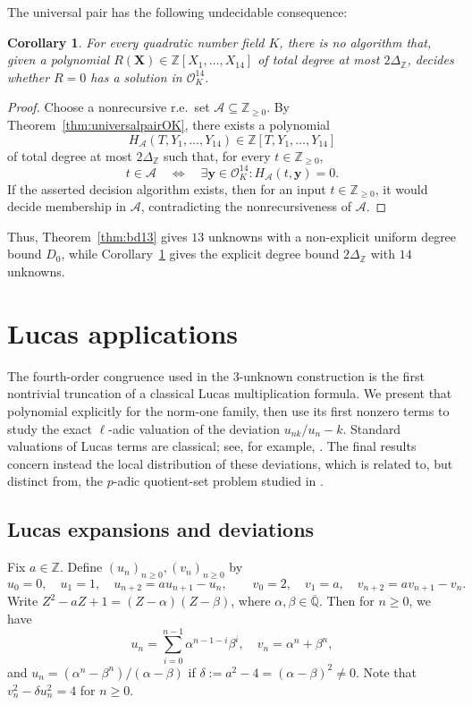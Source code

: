 \documentclass[12pt]{amsart}
\numberwithin{equation}{section}
\newtheorem{corollary}[theorem]{Corollary}
\theoremstyle{remark}
\theoremstyle{plain}
\newcommand{\Z}{\mathbb{Z}}
\newcommand{\Q}{\mathbb{Q}}
\newcommand{\sO}{\mathcal{O}}
\newcommand{\sA}{\mathcal{A}}
\newcommand{\bX}{\mathbf{X}}
\newcommand{\by}{\mathbf{y}}
\begin{document}
The universal pair has the following undecidable consequence:
\begin{corollary}\label{cor:explicit-bounded}
For every quadratic number field $K$, there is no algorithm that, given a polynomial $R(\bX)\in\Z[X_1,\ldots,X_{14}]$ of total degree at most $2\Delta_{\Z}$, decides whether $R=0$ has a solution in $\sO_K^{14}$.
\end{corollary}
\begin{proof}
Choose a nonrecursive r.e.\ set $\sA\subseteq\Z_{\geq0}$. By Theorem~\ref{thm:universalpairOK}, there exists a polynomial
\[
H_\sA(T,Y_1,\ldots,Y_{14})\in\Z[T,Y_1,\ldots,Y_{14}]
\]
of total degree at most $2\Delta_{\Z}$ such that, for every $t\in\Z_{\geq0}$,
\[
t\in\sA\quad\Longleftrightarrow\quad
\exists\by\in\sO_K^{14}:H_\sA(t,\by)=0.
\]
If the asserted decision algorithm exists, then for an input $t\in\Z_{\geq0}$, it would decide membership in $\sA$, contradicting the nonrecursiveness of $\sA$.
\end{proof}
Thus, Theorem~\ref{thm:bd13} gives $13$ unknowns with a non-explicit uniform degree bound $D_0$, while Corollary~\ref{cor:explicit-bounded} gives the explicit degree bound $2\Delta_{\Z}$ with $14$ unknowns.

\section{Lucas applications}\label{sec:pure-apps}
The fourth-order congruence used in the $3$-unknown construction is the first nontrivial truncation of a classical Lucas multiplication formula. We present that polynomial explicitly for the norm-one family, then use its first nonzero terms to study the exact $\ell$-adic valuation of the deviation $u_{nk}/u_{n}-k$. Standard valuations of Lucas terms are classical; see, for example, \cite{Sanna16,BW23}. The final results concern instead the local distribution of these deviations, which is related to, but distinct from, the $p$-adic quotient-set problem studied in \cite{AntonyBarman23,AntonyBarman25}.

\subsection{Lucas expansions and deviations}\label{sec:Lucas}
Fix $a\in\Z$. Define $(u_n)_{n\geq0},(v_n)_{n\geq0}$ by
\[
u_0=0,\quad u_1=1,\quad u_{n+2}=au_{n+1}-u_n,
\qquad
v_0=2,\quad v_1=a,\quad v_{n+2}=av_{n+1}-v_n.
\]
Write $Z^2-aZ+1=(Z-\alpha)(Z-\beta)$, where $\alpha,\beta\in\overline{\Q}$. Then for $n\geq0$, we have
\[
u_n=\sum_{i=0}^{n-1}\alpha^{n-1-i}\beta^i,\quad v_n=\alpha^n+\beta^n,
\]
and
$u_n=(\alpha^n-\beta^n)/(\alpha-\beta)$ if $\delta:=a^2-4=(\alpha-\beta)^2\neq0$. Note that $v_n^2-\delta u_n^2=4$ for $n\geq0$.
\end{document}
